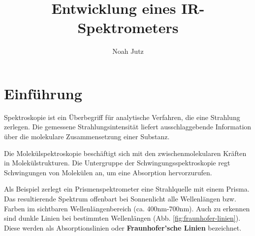 \documentclass{article}
\title{Entwicklung eines IR-Spektrometers}
\author{Noah Jutz}
\date{}
\begin{document}
\maketitle
\tableofcontents

\newpage
\section{Einführung}




Spektroskopie ist ein Überbegriff für analytische Verfahren, die eine Strahlung zerlegen. Die gemessene Strahlungsintensität liefert ausschlaggebende Information über die molekulare Zusammensetzung einer Substanz.

Die Molekülspektroskopie beschäftigt sich mit den zwischenmolekularen Kräften in Molekülstrukturen. Die Untergruppe der Schwingungsspektroskopie regt Schwingungen von Molekülen an, um eine Absorption hervorzurufen.


Als Beispiel zerlegt ein Prismenspektrometer eine Strahlquelle mit einem Prisma. Das resultierende Spektrum offenbart bei Sonnenlicht alle Wellenlängen bzw. Farben im sichtbaren Wellenlängenbereich (ca. 400nm-700nm). Auch zu erkennen sind dunkle Linien bei bestimmten Wellenlängen (Abb. \ref{fig:fraunhofer-linien}). Diese werden als Absorptionslinien oder \textbf{Fraunhofer'sche Linien} bezeichnet.
\end{document}
